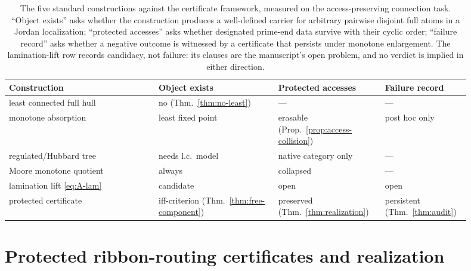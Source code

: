 \documentclass[11pt,reqno]{amsart}
\theoremstyle{definition}
\theoremstyle{remark}
\begin{document}
\begin{table}[htbp]
\centering
\small
\begin{tabular}{@{}p{0.30\linewidth}p{0.24\linewidth}p{0.21\linewidth}p{0.15\linewidth}@{}}
\toprule
Construction & Object exists & Protected accesses & Failure record\\
\midrule
least connected full hull & no (Thm.~\ref{thm:no-least}) & --- & ---\\
monotone absorption & least fixed point \cite{MWman} &
  erasable (Prop.~\ref{prop:access-collision}) & post hoc only\\
regulated/Hubbard tree & needs l.c.\ model \cite{DH85,KKL26} &
  native category only & ---\\
Moore monotone quotient & always \cite{Moo25} & collapsed & ---\\
lamination lift \eqref{eq:A-lam} & candidate \cite{MWman} & open & open\\
protected certificate & iff-criterion (Thm.~\ref{thm:free-component}) &
  preserved (Thm.~\ref{thm:realization}) &
  persistent (Thm.~\ref{thm:audit})\\
\bottomrule
\end{tabular}
\caption{The five standard constructions against the certificate
framework, measured on the access-preserving connection task.  ``Object
exists'' asks whether the construction produces a well-defined carrier
for arbitrary pairwise disjoint full atoms in a Jordan localization;
``protected accesses'' asks whether designated prime-end data survive
with their cyclic order; ``failure record'' asks whether a negative
outcome is witnessed by a certificate that persists under monotone
enlargement.  The lamination-lift row records candidacy, not failure:
its clauses are the manuscript's open problem, and no verdict is implied
in either direction.}
\label{tab:A-comparison}
\end{table}


\section{Protected ribbon-routing certificates and realization}
\label{sec:certificates}
\end{document}
